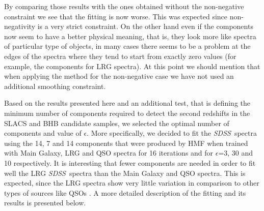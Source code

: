 \documentclass[12pt,preprint]{aastex}
\newcommand{\project}[1]{\textsl{#1}}
\newcommand{\sdss}{\project{SDSS}}
\newcommand{\SDSS}{\sdss}
\begin{document}
By comparing those results with the ones obtained without the
non-negative constraint we see that the fitting is now worse. This was
expected since non-negativity is a very strict constraint. On the
other hand even if the components now seem to have a better physical
meaning, that is, they look more like spectra of particular type of
objects, in many cases there seems to be a problem at the edges of the
spectra where they tend to start from exactly zero values (for
example, the components for LRG spectra). At this point we should
mention that when applying the method for the non-negative case we
have not used an additional smoothing constraint.

Based on the results presented here and an additional test, that is 
defining the minimum number of components required to detect the 
second redshifts in the SLACS and BHB candidate samples, we selected 
the optimal number of components and value of $\epsilon$. More specifically, 
we decided to fit the \SDSS\ spectra using the 14, 7 and 14 components 
that were produced by HMF when trained with Main Galaxy, LRG
and QSO spectra for 16 iterations and for $\epsilon$=3, 30 and 10
respectively. It is interesting that fewer components are needed in
order to fit well the LRG \SDSS\ spectra than the Main
Galaxy and QSO spectra.  This is expected, since the LRG spectra show
very little variation \citep{eishogg} in comparison to other 
types of sources like QSOs \citep{yip}. A more detailed description of
the fitting and its results is presented below.
\end{document}
